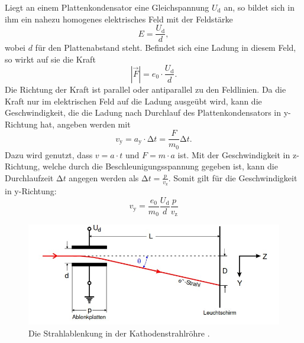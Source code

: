     Liegt an einem Plattenkondensator eine Gleichspannung $U_{\text{d}}$ an, so bildet sich in ihm ein nahezu homogenes elektrisches Feld mit der Feldstärke
    \begin{equation*}
        E = \frac{U_{\text{d}}}{d}, 
    \end{equation*}
    wobei $d$ für den Plattenabstand steht. Befindet sich eine Ladung in diesem Feld, so wirkt auf sie die Kraft
    \begin{equation*}
        |\vec{F}| = e_0 \cdot \frac{U_{\text{d}}}{d}.
    \end{equation*}
    Die Richtung der Kraft ist parallel oder antiparallel zu den Feldlinien. Da die Kraft nur im elektrischen Feld auf die Ladung ausgeübt wird, kann die Geschwindigkeit, 
    die die Ladung nach Durchlauf des Plattenkondensators in y-Richtung hat, angeben werden mit  
    \begin{equation*}
        v_{\text{y}} = a_{\text{y}} \cdot \increment t = \frac{F}{m_0} \increment t. 
    \end{equation*}
    Dazu wird genutzt, dass $v = a \cdot t$ und $F = m \cdot a$ ist. Mit der Geschwindigkeit in z-Richtung, welche durch die Beschleunigungsspannung gegeben ist, 
    kann die Durchlaufzeit $\increment t$ angegen werden als $\increment t = \frac{p}{v_{\text{z}}}$. Somit gilt für die Geschwindigkeit in y-Richtung:
    \begin{equation*}
        v_{\text{y}} = \frac{e_0}{m_0} \frac{U_{\text{d}}}{d} \frac{p}{v_{\text{z}}}
    \end{equation*}
    
    \begin{figure}
        \centering
        \includegraphics[width=\textwidth]{bilder/strahlablenkung_efeld.jpg}
        \caption{Die Strahlablenkung in der Kathodenstrahlröhre \cite{anleitung501}.}
        \label{fig:strahlablenkung_efeld}
    \end{figure}

